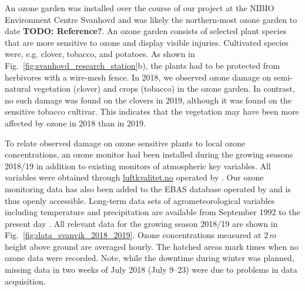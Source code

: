 \documentclass[bg, manuscript]{copernicus}
\begin{document}
An ozone garden was installed over the course of our project at the NIBIO Environment Centre Svanhovd and was likely the northern-most ozone garden to date {\bf TODO: Reference?}. An ozone garden consists of selected plant species that are more sensitive to ozone and display visible injuries. Cultivated species were, e.g. clover, tobacco, and potatoes. As shown in Fig.~\ref{fig:svanhovd_research_station}b), the plants had to be protected from herbivores with a wire-mesh fence. In 2018, we observed ozone damage on semi-natural vegetation (clover) and crops (tobacco) in the ozone garden. In contrast, no such damage was found on the clovers in 2019, although it was found on the sensitive tobacco cultivar. This indicates that the vegetation may have been more affected by ozone in 2018 than in 2019.

To relate observed damage on ozone sensitive plants to local ozone concentrations, an ozone monitor had been installed during the growing seasons 2018/19 in addition to existing monitors of atmospheric key variables. All variables were obtained through \href{luftkvalitet.no}{luftkvalitet.no} operated by \citet{NILU_AIRQ}. Our ozone monitoring data has also been added to the EBAS database operated by \citet{NILU_EBAS} and is thus openly accessible.
Long-term data sets of agrometeorological variables including temperature and precipitation are available from September 1992 to the present day \citep[LandbruksMeteorologiske Tjeneste][note the station name here is Pasvik]{LMT_NIBIO}.
All relevant data for the growing season 2018/19 are shown in Fig.~\ref{fig:data_svanvik_2018_2019}. Ozone concentrations \chem{[O_3]} measured at $2\,\unit{m}$ height above ground are averaged hourly. The hatched areas mark times when no ozone data were recorded. Note, while the downtime during winter was planned, missing data in two weeks of July 2018 (July 9--23) were due to problems in data acquisition.
\end{document}
